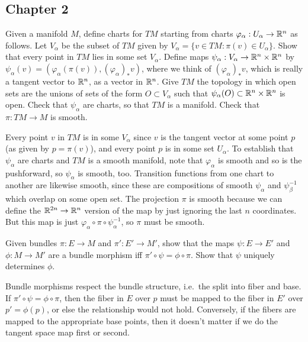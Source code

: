 
\subsection{Chapter 2}

\begin{p}%
{Given a manifold $M$, define charts for $TM$ starting from charts $\varphi_\alpha:U_\alpha\rightarrow \mathbb{R}^n$ as follows. Let $V_\alpha$ be the subset of $TM$ given by $V_\alpha=\{v\in TM:\pi(v)\in U_\alpha\}$. Show that every point in $TM$ lies in some set $V_\alpha$. Define
maps $\psi_\alpha:V_\alpha\rightarrow \mathbb{R}^n\times \mathbb{R}^n$ by $\psi_\alpha(v)=(\varphi_\alpha(\pi(v)),(\varphi_\alpha)_*v)$, where we think of $(\varphi_\alpha)_*v$, which is really a tangent vector to $\mathbb{R}^n$, as
a vector in $\mathbb{R}^n$. Give $TM$ the topology in which open sets are the unions of sets of the form $O\subset V_\alpha$ such that $\psi_\alpha(O)\subset \mathbb{R}^n\times \mathbb{R}^n$ is open. Check that $\psi_\alpha$ are charts, so that $TM$ is a manifold. Check that $\pi:TM\rightarrow M$ is smooth.}
\end{p}
{Every point $v$ in $TM$ is in some $V_\alpha$ since $v$ is the tangent vector at some point $p$ (as given by $p=\pi(v)$), and every point $p$ is in some set $U_\alpha$. To establish that $\psi_\alpha$ are charts and $TM$ is a smooth manifold, note that $\varphi_\alpha$ is smooth and so is the pushforward, so $\psi_\alpha$ is smooth, too. Transition functions
from one chart to another are likewise smooth, since these are compositions of smooth $\psi_\alpha$ and $\psi^{-1}_\beta$ which overlap on some open set. The projection $\pi$ is smooth because we can define 
the $\mathbb{R}^{2n}\rightarrow \mathbb{R}^n$ version of the map by just ignoring the last $n$ coordinates. But this map is just $\varphi_\alpha\circ\pi\circ\psi_\alpha^{-1}$, so $\pi$ must be smooth.}

\begin{p}%
{Given bundles $\pi:E\rightarrow M$ and $\pi':E'\rightarrow M'$, show that the maps $\psi:E\rightarrow E'$ and $\phi:M\rightarrow M'$ are a bundle morphism iff $\pi'\circ\psi=\phi\circ\pi$. Show that
$\psi$ uniquely determines $\phi$.}
\end{p}
{Bundle morphisms respect the bundle structure, i.e.~the split into fiber and base. If $\pi'\circ\psi=\phi\circ\pi$, then the fiber in $E$ over $p$ must be mapped to the fiber in $E'$ over $p'=\phi(p)$, or else the relationship would not hold. Conversely, if the fibers are mapped to the appropriate base
points, then it doesn't matter if we do the tangent space map first or second.}

